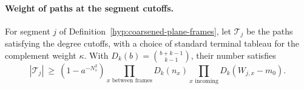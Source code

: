 \paragraph{Weight of paths at the segment cutoffs.}
\label{par:plane-typical}
\begin{lemma}
\label{lem:good-plane-path-count}
For segment \(j\) of Definition~\ref{hyp:coarsened-plane-frames}, let \(\mathcal T_j\) be the paths satisfying the degree cutoffs, with a choice of standard terminal tableau for the complement weight \(\kappa\). With \(D_k(b)=\binom{b+k-1}{k-1}\), their number satisfies
\begin{equation}\label{eq:plane-good-path-count}
 |\mathcal T_j|\ \ge\ (1-a^{-N_s^2})
    \prod_{x\text{ between frames}}D_k(n_x)
    \prod_{x\text{ incoming}}D_k(W_{j,x}-m_0).
\end{equation}
\end{lemma}

